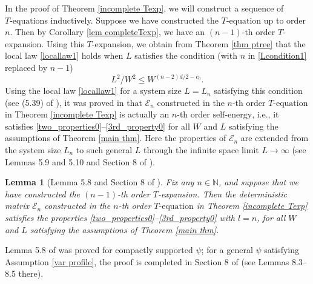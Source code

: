 \documentclass{article}
\newcommand{\1}{\mathds{1}}
\numberwithin{equation}{section}
\newcommand{\be}{\begin{equation}}
\newcommand{\ee}{\end{equation}}
\renewcommand{\leq}{\leqslant}
\renewcommand{\le}{\leq}
\newcommand{\N}{\mathbb{N}}
\newcommand{\self}{\text{self-energy}}
\theoremstyle{plain} %
\newtheorem{lemma}[theorem]{Lemma}
\theoremstyle{remark}
\newcommand{\Sele}{{\mathcal E}}
\newcommand{\incomp}{{\text{$T$-equation}}}
\begin{document}


In the proof of Theorem \ref{incomplete Texp}, we will construct a sequence of $\incomp$s inductively. Suppose we have constructed the $\incomp$ up to order $n$. Then by Corollary \ref{lem completeTexp}, we have an $(n-1)$-th order $T$-expansion. Using this $T$-expansion, we obtain from Theorem \ref{thm ptree} that the local law \eqref{locallaw1} holds when $L$ satisfies the condition (with $n$ in \eqref{Lcondition1} replaced by $n-1$)
\be\nonumber %
{L^2}/{W^2}  \le W^{(n-2)d/2-c_0} .
\ee
Using the local law \eqref{locallaw1} for a system size $L=L_n$ satisfying this condition (see (5.39) of \cite{PartI_high}), it was proved in \cite{PartI_high} that $\Sele_n$ constructed in the $n$-th order $\incomp$ in Theorem \ref{incomplete Texp} is actually an $n$-th order $\self$, i.e., it satisfies \eqref{two_properties0}--\eqref{3rd_property0} for all $W$ and $L$ satisfying the assumptions of Theorem \ref{main thm}. Here the properties of $\Sele_n$ are extended from the system size $L_n$ to such general $L$ through the infinite space limit $L\to \infty$ (see Lemmas 5.9 and 5.10 and Section 8 of \cite{PartI_high}).

\begin{lemma}[Lemma 5.8 and Section 8 of \cite{PartI_high}]\label{cancellation property}
Fix any $n\in \N$, and suppose that we have constructed the $(n-1)$-th order $T$-expansion. Then the deterministic matrix $\Sele_n$ constructed in the $n$-th order $\incomp$ in Theorem \ref{incomplete Texp} satisfies the properties \eqref{two_properties0}--\eqref{3rd_property0} with $l=n$, for all $W$ and $L$ satisfying the assumptions of Theorem \ref{main thm}.
\end{lemma}
Lemma 5.8 of \cite{PartI_high} was proved for compactly supported $\psi$; for a general $\psi$ satisfying Assumption \ref{var profile}, the proof is completed in Section 8 of \cite{PartI_high} (see Lemmas 8.3--8.5 there).
\end{document}
